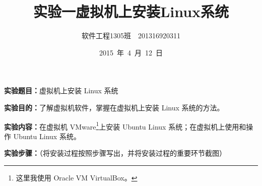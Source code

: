 \documentclass[cs4size,a4paper,nofonts]{ctexart}
\def\tjf{{\tt{田劲锋}}}
\def\titlec{实验一\quad 虚拟机上安装Linux系统}
\begin{document}

\title{\bf\titlec}
\author{软件工程1305班~\quad\tjf\quad~201316920311}
\date{2015~年~4~月~12~日}
\maketitle

{\bf 实验题目：}虚拟机上安装 Linux 系统

{\bf 实验目的：}了解虚拟机软件，掌握在虚拟机上安装 Linux 系统的方法。

{\bf 实验内容：}在虚拟机 VMware\footnote{这里我使用 Oracle VM VirtualBox。}上安装 Ubuntu Linux 系统；在虚拟机上使用和操作 Ubuntu Linux 系统。

{\bf 实验步骤：}（将安装过程按照步骤写出，并将安装过程的重要环节截图）

\newcommand{\image}[2]{\begin{minipage}[t]{0.5\textwidth}
\centering
\texttt{[image: images/\#1.png]}
\caption{#2}
\label{fig:#2}
\end{minipage}}
\end{document}
